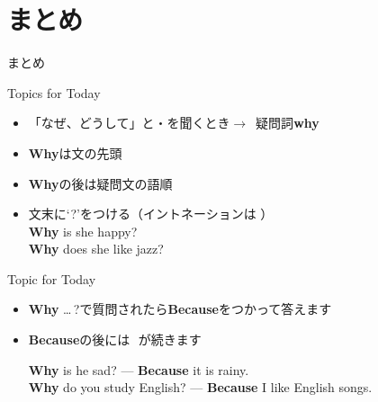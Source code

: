 \documentclass[aspectratio=169,xcolor={dvipsnames,table}]{beamer}
\begin{document}
\section{まとめ}
\begin{frame}[plain]{まとめ}
 
\begin{exampleblock}{Topics for Today}
\begin{itemize}[square]\small
 \item 「なぜ、どうして」と・を聞くとき$\longrightarrow$\,\,\,疑問詞{\bfseries why} 
 \item {\bfseries Why}は文の先頭
 \item {\bfseries Why}の後は疑問文の語順
 \item   文末に`?'をつける（イントネーションは\myDownwardPitch{}\,\,）\\
\hfill{}{\scriptsize {\bfseries Why} is she happy?}\\
\hfill{}{\scriptsize {\bfseries Why} does she like jazz?}
\end{itemize}
     \end{exampleblock}


\begin{exampleblock}{Topic for Today}
\begin{itemize}[square]\small
 \item {\bfseries Why} \ldots\,?で質問されたら{\bfseries Because}をつかって答えます\hfill{\scriptsize {}}
 \item {\bfseries Because}の後には\,\,\,\,が続きます

\hfill{}{\scriptsize {\bfseries Why} is he sad? --- {\bfseries Because} it is rainy.}\\
\hfill{}{\scriptsize {\bfseries Why} do you study English? --- {\bfseries Because} I like English songs.}
\end{itemize}
     \end{exampleblock}
\hfill{\scriptsize {}}
\end{frame}
\end{document}

